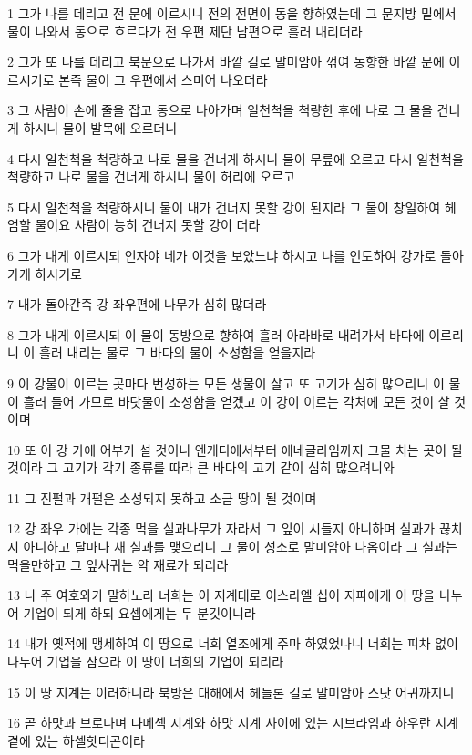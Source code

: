\par 1 그가 나를 데리고 전 문에 이르시니 전의 전면이 동을 향하였는데 그 문지방 밑에서 물이 나와서 동으로 흐르다가 전 우편 제단 남편으로 흘러 내리더라
\par 2 그가 또 나를 데리고 북문으로 나가서 바깥 길로 말미암아 꺾여 동향한 바깥 문에 이르시기로 본즉 물이 그 우편에서 스미어 나오더라
\par 3 그 사람이 손에 줄을 잡고 동으로 나아가며 일천척을 척량한 후에 나로 그 물을 건너게 하시니 물이 발목에 오르더니
\par 4 다시 일천척을 척량하고 나로 물을 건너게 하시니 물이 무릎에 오르고 다시 일천척을 척량하고 나로 물을 건너게 하시니 물이 허리에 오르고
\par 5 다시 일천척을 척량하시니 물이 내가 건너지 못할 강이 된지라 그 물이 창일하여 헤엄할 물이요 사람이 능히 건너지 못할 강이 더라
\par 6 그가 내게 이르시되 인자야 네가 이것을 보았느냐 하시고 나를 인도하여 강가로 돌아가게 하시기로
\par 7 내가 돌아간즉 강 좌우편에 나무가 심히 많더라
\par 8 그가 내게 이르시되 이 물이 동방으로 향하여 흘러 아라바로 내려가서 바다에 이르리니 이 흘러 내리는 물로 그 바다의 물이 소성함을 얻을지라
\par 9 이 강물이 이르는 곳마다 번성하는 모든 생물이 살고 또 고기가 심히 많으리니 이 물이 흘러 들어 가므로 바닷물이 소성함을 얻겠고 이 강이 이르는 각처에 모든 것이 살 것이며
\par 10 또 이 강 가에 어부가 설 것이니 엔게디에서부터 에네글라임까지 그물 치는 곳이 될 것이라 그 고기가 각기 종류를 따라 큰 바다의 고기 같이 심히 많으려니와
\par 11 그 진펄과 개펄은 소성되지 못하고 소금 땅이 될 것이며
\par 12 강 좌우 가에는 각종 먹을 실과나무가 자라서 그 잎이 시들지 아니하며 실과가 끊치지 아니하고 달마다 새 실과를 맺으리니 그 물이 성소로 말미암아 나옴이라 그 실과는 먹을만하고 그 잎사귀는 약 재료가 되리라
\par 13 나 주 여호와가 말하노라 너희는 이 지계대로 이스라엘 십이 지파에게 이 땅을 나누어 기업이 되게 하되 요셉에게는 두 분깃이니라
\par 14 내가 옛적에 맹세하여 이 땅으로 너희 열조에게 주마 하였었나니 너희는 피차 없이 나누어 기업을 삼으라 이 땅이 너희의 기업이 되리라
\par 15 이 땅 지계는 이러하니라 북방은 대해에서 헤들론 길로 말미암아 스닷 어귀까지니
\par 16 곧 하맛과 브로다며 다메섹 지계와 하맛 지계 사이에 있는 시브라임과 하우란 지계 곁에 있는 하셀핫디곤이라
